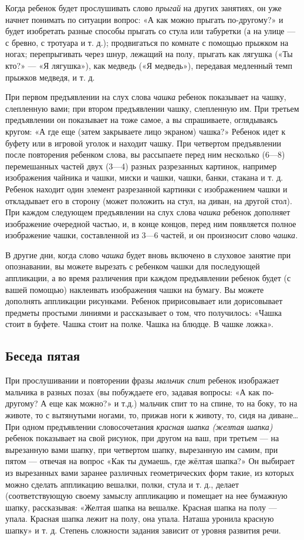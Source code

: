 \documentclass{book}
\renewcommand{\emph}[1]{\textit{#1}}
\begin{document}
Когда ребенок будет прослушивать слово \emph{прыгай} на других занятиях,
он уже начнет понимать по ситуации вопрос: «А как можно прыгать
по-другому?» и будет изобретать разные способы прыгать со стула или
табуретки (а на улице --- с бревно, с тротуара и т. д.); продвигаться по
комнате с помощью прыжком на ногах; перепрыгивать через шнур, лежащий на
полу, прыгать как лягушка («Ты кто?» --- «Я лягушка»), как медведь («Я
медведь»), передавая медленный темп прыжков медведя, и т. д.

При первом предъявлении на слух слова \emph{чашка} ребенок показывает на
чашку, слепленную вами; при втором предъявлении чашку, слепленную им.
При третьем предъявлении он показывает на тоже самое, а вы спрашиваете,
оглядываясь кругом: «А где еще (затем закрываете лицо экраном) чашка?»
Ребенок идет к буфету или в игровой уголок и находит чашку. При
четвертом предъявлении после повторения ребенком слова, вы рассыпаете
перед ним несколько (6---8) перемешанных частей двух (3---4) разных
разрезанных картинок, например изображения чайника и чашки, миски и
чашки, чашки, банки, стакана и т. д. Ребенок находит один элемент
разрезанной картинки с изображением чашки и откладывает его в сторону
(может положить на стул, на диван, на другой стол). При каждом следующем
предъявлении на слух слова \emph{чашка} ребенок дополняет изображение
очередной частью, и, в конце концов, перед ним появляется полное
изображение чашки, составленной из 3---6 частей, и он произносит слово
\emph{чашка.}

В другие дни, когда слово \emph{чашка} будет вновь включено в слуховое
занятие при опознавании, вы можете вырезать с ребенком чашки для
последующей аппликации, а во время различения при каждом предъявлении
ребенок будет (с вашей помощью) наклеивать изображения чашки на бумагу.
Вы можете дополнять аппликации рисунками. Ребенок пририсовывает или
дорисовывает предметы простыми линиями и рассказывает о том, что
получилось: «Чашка стоит в буфете. Чашка стоит на полке. Чашка на
блюдце. В чашке ложка».

\subsection*{Беседа пятая}

При прослушивании и повторении фразы \emph{мальчик спит} ребенок
изображает мальчика в разных позах (вы побуждаете его, задавая вопросы:
«А как по-другому? А еще как можно?» и т.д.) мальчик спит то на спине,
то на боку, то на животе, то с вытянутыми ногами, то, прижав ноги к
животу, то, сидя на диване\ldots{} При одном предъявлении словосочетания
\emph{красная шапка (желтая шапка)} ребенок показывает на свой рисунок,
при другом на ваш, при третьем --- на вырезанную вами шапку, при
четвертом шапку, вырезанную им самим, при пятом --- отвечая на вопрос
«Как ты думаешь, где жёлтая шапка?» Он выбирает из вырезанных вами
заранее различных геометрических форм такие, из которых можно сделать
аппликацию вешалки, полки, стула и т. д., делает (соответствующую своему
замыслу аппликацию и помещает на нее бумажную шапку, рассказывая:
«Желтая шапка на вешалке. Красная шапка на полу --- упала. Красная шапка
лежит на полу, она упала. Наташа уронила красную шапку» и т. д. Степень
сложности задания зависит от уровня развития речи.
\end{document}
